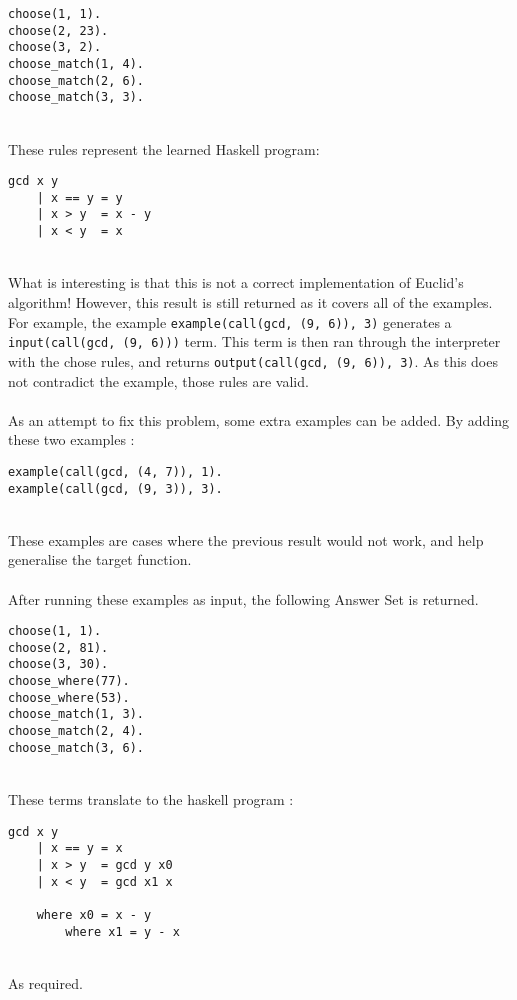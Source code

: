 \begin{multicols}{2}
\begin{lstlisting}
choose(1, 1).
choose(2, 23).
choose(3, 2).
choose_match(1, 4).
choose_match(2, 6).
choose_match(3, 3).
\end{lstlisting}
\end{multicols}
\mbox{}\\
These rules represent the learned Haskell program: \\

\begin{lstlisting}
gcd x y
	| x == y = y
	| x > y  = x - y
	| x < y  = x
\end{lstlisting}
\mbox{}\\
What is interesting is that this is not a correct implementation of Euclid's algorithm! However, this result is still returned as it covers all of the examples. For example, the example \lstinline{example(call(gcd, (9, 6)), 3)} generates a \lstinline{input(call(gcd, (9, 6)))} term. This term is then ran through the interpreter with the chose rules, and returns \lstinline{output(call(gcd, (9, 6)), 3)}. As this does not contradict the example, those rules are valid. \\ \\%
As an attempt to fix this problem, some extra examples can be added. By adding these two examples :\\

\begin{lstlisting}
example(call(gcd, (4, 7)), 1).
example(call(gcd, (9, 3)), 3).
\end{lstlisting}
\mbox{}\\
These examples are cases where the previous result would not work, and help generalise the target function. \\ \\
After running these examples as input, the following Answer Set is returned. \\

\begin{lstlisting}
choose(1, 1).
choose(2, 81).
choose(3, 30).
choose_where(77).
choose_where(53).
choose_match(1, 3).
choose_match(2, 4).
choose_match(3, 6).
\end{lstlisting}
\mbox{} \\
These terms translate to the haskell program :

\begin{lstlisting}
gcd x y
	| x == y = x
	| x > y  = gcd y x0
	| x < y  = gcd x1 x
	
	where x0 = x - y
		where x1 = y - x
\end{lstlisting}
\mbox{}\\
As required.

